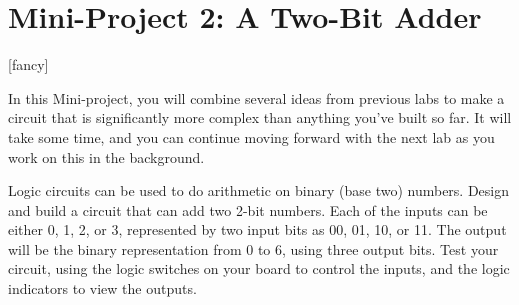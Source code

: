\section*{Mini-Project 2: A Two-Bit Adder}
\label{lab_proportional_controller}

[fancy]{%
	\fancyhead[LO,RE]{}
}
\pagestyle{interlude}



\bigskip

In this Mini-project, you will combine several ideas from previous labs to make a circuit that is significantly more complex than anything you've built so far.  It will take some time, and you can continue moving forward with the next lab as you work on this in the background.  

\medskip

Logic circuits can be used to do arithmetic on binary (base two) numbers.  Design and build a circuit that can add two 2-bit numbers.  Each of the inputs can be either 0, 1, 2, or 3, represented by two input bits as 00, 01, 10, or 11.  The output will be the binary representation from 0 to 6, using three output bits.  Test your circuit, using the logic switches on your board to control the inputs, and the logic indicators to view the outputs.


